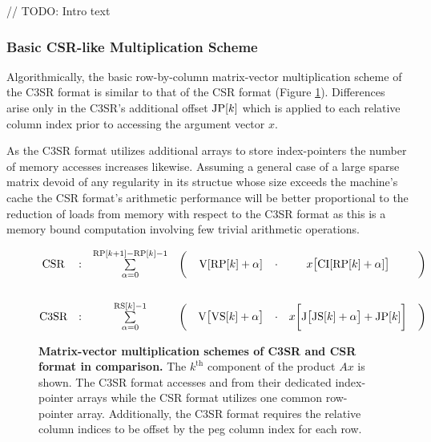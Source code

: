 \documentclass{article}
\begin{document}
    // TODO: Intro text

    \subsubsection{Basic CSR-like Multiplication Scheme} \label{subsubsec:basic-csr-like-multiplication-scheme}

      Algorithmically, the basic row-by-column matrix-vector multiplication scheme of the C3SR format is similar to that of the CSR format (Figure \ref{fig:c3sr_matvecmult_basic}). Differences arise only in the C3SR's additional offset $\JP[k]$ which is applied to each relative column index prior to accessing the argument vector $x$.

      As the C3SR format utilizes additional arrays to store index-pointers the number of memory accesses increases likewise. Assuming a general case of a large sparse matrix devoid of any regularity in its structue whose size exceeds the machine's cache the CSR format's arithmetic performance will be better proportional to the reduction of loads from memory with respect to the C3SR format as this is a memory bound computation involving few trivial arithmetic operations.

      \begin{figure}[ht]
        \centering
        $$
        \begin{matrix}
          \text{CSR}  & : & \sum \limits_{\alpha = 0}^{\RP[k+1] - \RP[k] - 1} & \bigg( & \V[\RP[k] + \alpha]   & \cdot & x\big[\CI[\RP[k] + \alpha]\big] & \bigg)\\
          \vspace{0.3cm} \\
          \text{C3SR} & : & \sum \limits_{\alpha = 0}^{\RS[k] - 1} & \bigg( & \V\big[\VS[k] + \alpha\big] & \cdot & x\bigg[\J\big[\JS[k] + \alpha\big] + \JP[k]\bigg] & \bigg) \\
        \end{matrix}
        $$
        \caption[Matrix-vector multiplication schemes of C3SR and CSR format in comparison.]{\textbf{Matrix-vector multiplication schemes of C3SR and CSR format in comparison.} The $k^{\text{th}}$ component of the product $Ax$ is shown. The C3SR format accesses \V and \J from their dedicated index-pointer arrays while the CSR format utilizes one common row-pointer array. Additionally, the C3SR format requires the relative column indices to be offset by the peg column index for each row.}
        \label{fig:c3sr_matvecmult_basic}
      \end{figure}
\end{document}
